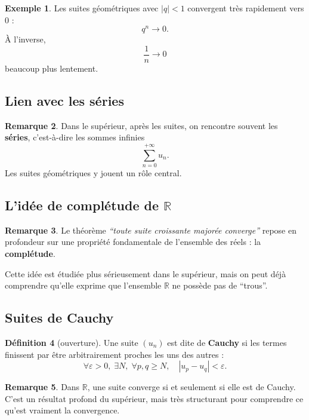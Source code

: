 \documentclass[11pt,a4paper]{article}
\theoremstyle{definition}
\newtheorem{definition}{Définition}[section]
\newtheorem{exemple}[definition]{Exemple}
\newtheorem{remarque}[definition]{Remarque}
\theoremstyle{plain}
\theoremstyle{remark}
\newcommand{\R}{\mathbb{R}}
\newcommand{\eps}{\varepsilon}
\begin{document}
\begin{exemple}
Les suites géométriques avec $|q|<1$ convergent très rapidement vers $0$ :
\[
q^n\to0.
\]
À l'inverse,
\[
\frac1n\to0
\]
beaucoup plus lentement.
\end{exemple}

\subsection{Lien avec les séries}

\begin{remarque}
Dans le supérieur, après les suites, on rencontre souvent les \textbf{séries}, c'est-à-dire les sommes infinies
\[
\sum_{n=0}^{+\infty}u_n.
\]
Les suites géométriques y jouent un rôle central.
\end{remarque}

\subsection{L'idée de complétude de \(\R\)}

\begin{remarque}
Le théorème \emph{``toute suite croissante majorée converge''} repose en profondeur sur une propriété fondamentale de l'ensemble des réels : la \textbf{complétude}.

Cette idée est étudiée plus sérieusement dans le supérieur, mais on peut déjà comprendre qu'elle exprime que l'ensemble $\R$ ne possède pas de ``trous''.
\end{remarque}

\subsection{Suites de Cauchy}

\begin{definition}[ouverture]
Une suite $(u_n)$ est dite de \textbf{Cauchy} si les termes finissent par être arbitrairement proches les uns des autres :
\[
\forall \eps>0,\;\exists N,\;\forall p,q\geq N,\quad |u_p-u_q|<\eps.
\]
\end{definition}

\begin{remarque}
Dans $\R$, une suite converge si et seulement si elle est de Cauchy. C'est un résultat profond du supérieur, mais très structurant pour comprendre ce qu'est vraiment la convergence.
\end{remarque}

\end{document}
